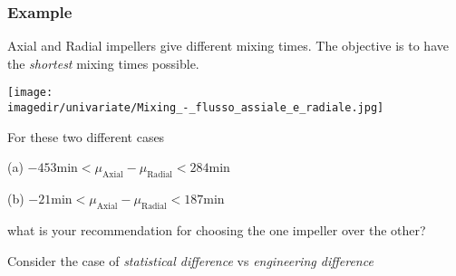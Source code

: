 \begin{frame}\frametitle{Example}

	Axial and Radial impellers give different mixing times. The objective is to have the \emph{shortest} mixing times possible.
	\begin{center}
		\texttt{[image: \\imagedir/univariate/Mixing\_-\_flusso\_assiale\_e\_radiale.jpg]}
	\end{center}
	\vspace{-6pt}
	For these two different cases

	(a) $-453 \text{min} < \mu_\text{Axial} - \mu_\text{Radial} < 284 \text{min} $

	(b) $-21 \text{min} < \mu_\text{Axial} - \mu_\text{Radial} < 187 \text{min} $

	what is your recommendation for choosing the one impeller over the other?

	Consider the case of \emph{statistical difference} vs \emph{engineering difference}
\end{frame}

